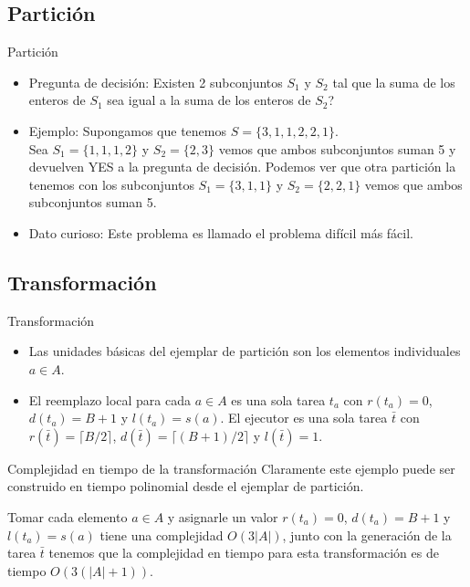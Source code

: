 \renewcommand{\subsectiontitle}{Partición}
\subsection{\subsectiontitle}

\begin{frame}{\subsectiontitle}
    \begin{itemize}
        \itemj Ejemplar genérico: Un multiconjunto $S$ de enteros positivos.
        \item Pregunta de decisión: Existen 2 subconjuntos $S_1$ y $S_2$ tal que la suma de los enteros de $S_1$ sea igual a la suma de los enteros de $S_2$?
        \item Ejemplo:
        Supongamos que tenemos $S=\{3,1,1,2,2,1\}$.\\
        Sea $S_1=\{1,1,1,2\}$ y $S_2=\{2,3\}$ vemos que ambos subconjuntos suman 5 y devuelven YES a la pregunta de decisión. Podemos ver que otra partición la tenemos con los subconjuntos $S_1=\{3,1,1\}$ y $S_2=\{2,2,1\}$ vemos que ambos subconjuntos suman 5.
        \item Dato curioso: Este problema es llamado el problema difícil más fácil.
    \end{itemize}
\end{frame}

\renewcommand{\subsectiontitle}{Transformación}
\subsection{\subsectiontitle}

\begin{frame}{\subsectiontitle}
    \begin{itemize}
        \itemj Sea el conjunto finito $A$ y un tamaño $s(a)$ para cada $a\in A$ el ejemplar genérico del problema partición y $B=\Sigma_{_{a\in A}}$ $ s(a)$.
        \item Las unidades básicas del ejemplar de partición son los elementos individuales $a\in A$.
        \item El reemplazo local para cada $a\in A$ es una sola tarea $t_a$ con $r(t_a)= 0$, $d(t_a)=B+1$ y $l(t_a)=s(a)$. El ejecutor es una sola tarea $\bar{t}$ con $r(\bar{t})= \lceil B/2\rceil$, $d(\bar{t})=\lceil (B+1)/2\rceil$ y $l(\bar{t})=1$.
    \end{itemize}
\end{frame}
\begin{frame}{Complejidad en tiempo de la transformación}
    Claramente este ejemplo puede ser construido en tiempo polinomial desde el ejemplar de partición.
    \begin{itemize}
        \itemj Tomar cada elemento $a\in A$ y asignarle un valor $r(t_a)= 0$, $d(t_a)=B+1$ y $l(t_a)=s(a)$ tiene una complejidad $O(3|A|)$, junto con la generación de la tarea $\bar{t}$ tenemos que la complejidad en tiempo para esta transformación es de tiempo $O(3(|A| +1))$.
    \end{itemize}
\end{frame}

